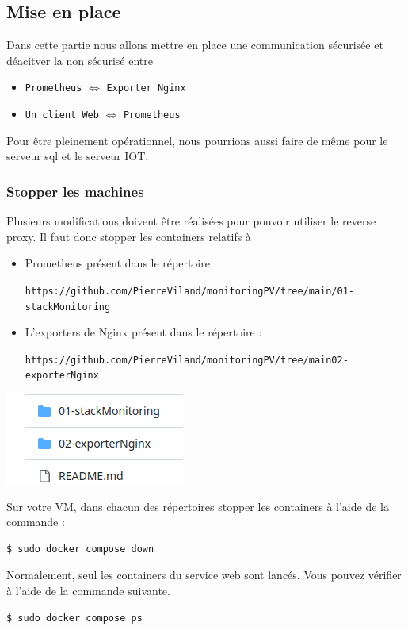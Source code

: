 \documentclass[french, 12pt]{article}%
\newcommand{\itemE}{\item[$\bullet$]}
\begin{document}
\subsection{Mise en place}

Dans cette partie nous allons mettre en place une communication sécurisée et déacitver la non sécurisé  entre 
\begin{itemize}
\itemE \verb?Prometheus? $\Leftrightarrow$ \verb?Exporter Nginx?
\itemE \verb?Un client Web? $\Leftrightarrow$ \verb?Prometheus?
\end{itemize}

Pour être pleinement opérationnel, nous pourrions aussi faire de même pour le serveur sql et le serveur IOT. 


\subsubsection{Stopper les machines}

Plusieurs modifications doivent être réalisées pour pouvoir utiliser le reverse proxy. Il faut donc stopper les containers relatifs à 
\begin{itemize}
\itemE Prometheus  présent dans le répertoire 

\verb?https://github.com/PierreViland/monitoringPV/tree/main/01-stackMonitoring?
\itemE L'exporters de Nginx présent dans le répertoire : 

 \verb?https://github.com/PierreViland/monitoringPV/tree/main02-exporterNginx?
\end{itemize}

\begin{center}
\includegraphics[scale=0.5]{./ressource/repMonitoring}
\end{center}

Sur votre VM, dans chacun des répertoires stopper les containers à l'aide de la commande : 

\begin{lstlisting}[style=commande] 
$ sudo docker compose down
\end{lstlisting} 

Normalement, seul les containers du service web sont lancés. Vous pouvez vérifier à l'aide  de la commande suivante.
\begin{lstlisting}[style=commande] 
$ sudo docker compose ps
\end{lstlisting} 
\end{document}

